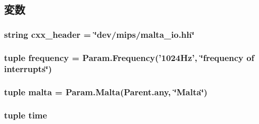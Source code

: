 \subsection{変数}
\hypertarget{classMalta_1_1MaltaIO_a17da7064bc5c518791f0c891eff05fda}{
\subsubsection[{cxx\_\-header}]{\setlength{\rightskip}{0pt plus 5cm}string {\bf cxx\_\-header} = \char`\"{}dev/mips/malta\_\-io.hh\char`\"{}}}
\label{classMalta_1_1MaltaIO_a17da7064bc5c518791f0c891eff05fda}
\hypertarget{classMalta_1_1MaltaIO_aa6caae816bc3cac7f328268ca3cdf2f7}{
\subsubsection[{frequency}]{\setlength{\rightskip}{0pt plus 5cm}tuple {\bf frequency} = Param.Frequency('1024Hz', \char`\"{}frequency of interrupts\char`\"{})}}
\label{classMalta_1_1MaltaIO_aa6caae816bc3cac7f328268ca3cdf2f7}
\hypertarget{classMalta_1_1MaltaIO_ae688b1cb082350c971cc4aaf26b66104}{
\subsubsection[{malta}]{\setlength{\rightskip}{0pt plus 5cm}tuple {\bf malta} = Param.Malta(Parent.any, \char`\"{}Malta\char`\"{})}}
\label{classMalta_1_1MaltaIO_ae688b1cb082350c971cc4aaf26b66104}
\hypertarget{classMalta_1_1MaltaIO_a429c35172fbcb8b1788bead147e4719b}{
\subsubsection[{time}]{\setlength{\rightskip}{0pt plus 5cm}tuple {\bf time}}}

